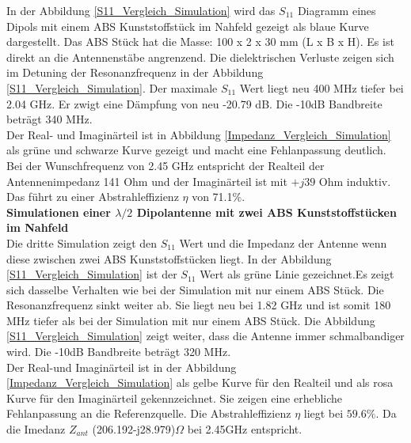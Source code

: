 In der Abbildung \ref{S11_Vergleich_Simulation} wird das $S_{11}$ Diagramm eines Dipols mit einem ABS Kunststoffstück im Nahfeld gezeigt als blaue Kurve dargestellt. Das ABS Stück hat die Masse: 100 x 2 x 30 mm (L x B x H). Es ist direkt an die Antennenstäbe angrenzend. Die dielektrischen Verluste zeigen sich im Detuning der Resonanzfrequenz in der Abbildung \ref{S11_Vergleich_Simulation}. Der maximale $S_{11}$ Wert liegt neu 400 MHz tiefer bei 2.04 GHz. Er zwigt eine Dämpfung von neu -20.79 dB. Die -10dB Bandbreite beträgt 340 MHz.\\

Der Real- und Imaginärteil ist in Abbildung \ref{Impedanz_Vergleich_Simulation} als grüne und schwarze Kurve gezeigt und macht eine Fehlanpassung deutlich. Bei der Wunschfrequenz von 2.45 GHz entspricht der Realteil der Antennenimpedanz 141 Ohm und der Imaginärteil ist mit $+j39$ Ohm induktiv. Das führt zu einer Abstrahleffizienz $\eta$ von 71.1$\%$.\\
\textbf{Simulationen einer $\lambda/2$ Dipolantenne mit zwei ABS Kunststoffstücken im Nahfeld}\\

Die dritte Simulation zeigt den $S_{11}$ Wert und die Impedanz der Antenne wenn diese zwischen zwei ABS Kunststoffstücken liegt. In der Abbildung \ref{S11_Vergleich_Simulation} ist der $S_{11}$ Wert als grüne Linie gezeichnet.Es zeigt sich dasselbe Verhalten wie bei der Simulation mit nur einem ABS Stück. Die Resonanzfrequenz sinkt weiter ab. Sie liegt neu bei 1.82 GHz und ist somit 180 MHz tiefer als bei der Simulation mit nur einem ABS Stück. Die Abbildung \ref{S11_Vergleich_Simulation} zeigt weiter, dass die Antenne immer schmalbandiger wird. Die -10dB Bandbreite beträgt 320 MHz.\\
Der Real-und Imaginärteil ist in der Abbildung \ref{Impedanz_Vergleich_Simulation} als gelbe Kurve für den Realteil und als rosa Kurve für den Imaginärteil gekennzeichnet. Sie zeigen eine erhebliche Fehlanpassung an die Referenzquelle. Die Abstrahleffizienz $\eta$ liegt bei $59.6 \%$. Da die Imedanz $Z_{ant}$ (206.192-j28.979)$\Omega$ bei 2.45GHz entspricht.\\




